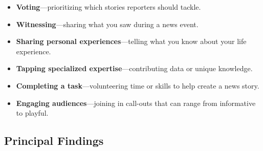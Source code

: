 \documentclass[notoc, symmetric, nobib, nols]{towcenter-guideto-book}
\begin{document}
\begin{itemize}
\item \textbf{Voting}---prioritizing which stories reporters should tackle. 
\item \textbf{Witnessing}---sharing what you saw during a news event.
\item \textbf{Sharing personal experiences}---telling what you know about your life experience. 
\item \textbf{Tapping specialized expertise}---contributing data or unique knowledge.
\item \textbf{Completing a task}---volunteering time or skills to help create a news story.
\item \textbf{Engaging audiences}---joining in call-outs that can range from informative to playful.
\end{itemize}

\subsection{Principal Findings}  
\end{document}
